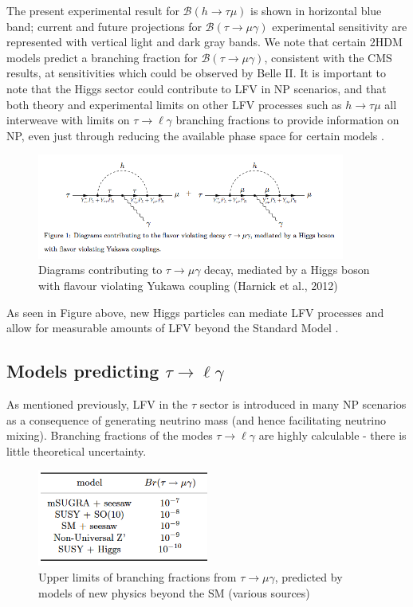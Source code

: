 \documentclass[12pt]{thesis}  %
\newcommand{\br}{\mathcal{B}}
\newcommand{\tmg}{\tau\to\mu\gamma}
\newcommand{\tlg}{\tau\to\ell\gamma}
\newcommand{\htm}{h\to \tau \mu}
\begin{document}
The present experimental result for $\br(\htm)$ is shown in horizontal blue band; current and future projections for $\br(\tmg)$ experimental sensitivity are represented with vertical light and dark gray bands. We note that certain 2HDM models predict a branching fraction for $\br(\tmg)$, consistent with the CMS results, at sensitivities which could be observed by Belle II. It is important to note that the Higgs sector could contribute to LFV in NP scenarios, and that both theory and experimental limits on other LFV processes such as $\htm$ all interweave with limits on $\tlg$ branching fractions to provide information on NP, even just through reducing the available phase space for certain models \cite{Dorsner:2015}.

\begin{figure}[h]
\centering
\includegraphics[width=0.9\textwidth]{images/higgs-lfv-modes.png}
\caption{Diagrams contributing to $\tmg$ decay, mediated by a Higgs boson with flavour violating Yukawa coupling (Harnick et al., 2012)}
\label{}
\end{figure}

As seen in Figure above, new Higgs particles can mediate LFV processes and allow for measurable amounts of LFV beyond the Standard Model \cite{Dorsner:2015}.


\subsection{Models predicting $\tlg$}

As mentioned previously, LFV in the $\tau$ sector is introduced in many NP scenarios as a consequence of generating neutrino mass (and hence facilitating neutrino mixing). Branching fractions of the modes $\tlg$ are highly calculable - there is little theoretical uncertainty.

\begin{figure}[h]
\centering
\includegraphics[width=0.5\textwidth]{images/np-models-bounds.png}
\caption{Upper limits of branching fractions from $\tmg$, predicted by models of new physics beyond the SM (various sources)\cite{Ohshima:2007zz}}
\label{}
\end{figure}
\end{document}
